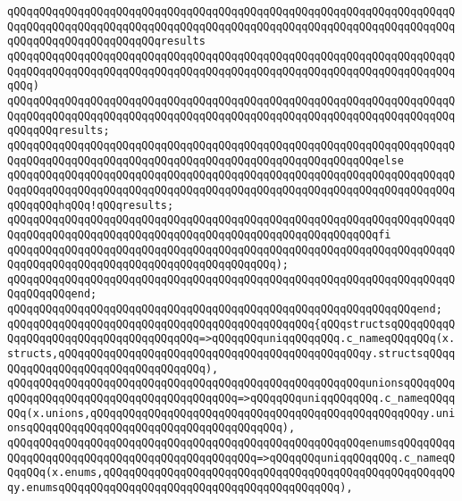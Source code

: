 \verb|qQQqqQQqqQQqqQQqqQQqqQQqqQQqqQQqqQQqqQQqqQQqqQQqqQQqqQQqqQQqqQQqqQQqqQQqqQQqqQQqqQQqqQQqqQQqqQQqqQQqqQQqqQQqqQQqqQQqqQQqqQQqqQQqqQQqqQQqqQQqqQQqqQQqqQQqqQQqqQQqqQQqresults|\newline
\verb|qQQqqQQqqQQqqQQqqQQqqQQqqQQqqQQqqQQqqQQqqQQqqQQqqQQqqQQqqQQqqQQqqQQqqQQqqQQqqQQqqQQqqQQqqQQqqQQqqQQqqQQqqQQqqQQqqQQqqQQqqQQqqQQqqQQqqQQqqQQqqQQq)|\newline
\newline
\verb|qQQqqQQqqQQqqQQqqQQqqQQqqQQqqQQqqQQqqQQqqQQqqQQqqQQqqQQqqQQqqQQqqQQqqQQqqQQqqQQqqQQqqQQqqQQqqQQqqQQqqQQqqQQqqQQqqQQqqQQqqQQqqQQqqQQqqQQqqQQqqQQqqQQqresults;|\newline
\verb|qQQqqQQqqQQqqQQqqQQqqQQqqQQqqQQqqQQqqQQqqQQqqQQqqQQqqQQqqQQqqQQqqQQqqQQqqQQqqQQqqQQqqQQqqQQqqQQqqQQqqQQqqQQqqQQqqQQqqQQqqQQqqQQqelse|\newline
\verb|qQQqqQQqqQQqqQQqqQQqqQQqqQQqqQQqqQQqqQQqqQQqqQQqqQQqqQQqqQQqqQQqqQQqqQQqqQQqqQQqqQQqqQQqqQQqqQQqqQQqqQQqqQQqqQQqqQQqqQQqqQQqqQQqqQQqqQQqqQQqqQQqqQQqhqQQq!qQQqresults;|\newline
\verb|qQQqqQQqqQQqqQQqqQQqqQQqqQQqqQQqqQQqqQQqqQQqqQQqqQQqqQQqqQQqqQQqqQQqqQQqqQQqqQQqqQQqqQQqqQQqqQQqqQQqqQQqqQQqqQQqqQQqqQQqqQQqqQQqfi|\newline
\verb|qQQqqQQqqQQqqQQqqQQqqQQqqQQqqQQqqQQqqQQqqQQqqQQqqQQqqQQqqQQqqQQqqQQqqQQqqQQqqQQqqQQqqQQqqQQqqQQqqQQqqQQqqQQqqQQq);|\newline
\verb|qQQqqQQqqQQqqQQqqQQqqQQqqQQqqQQqqQQqqQQqqQQqqQQqqQQqqQQqqQQqqQQqqQQqqQQqqQQqqQQqend;|\newline
\verb|qQQqqQQqqQQqqQQqqQQqqQQqqQQqqQQqqQQqqQQqqQQqqQQqqQQqqQQqqQQqqQQqend;|\newline
\newline
\verb|qQQqqQQqqQQqqQQqqQQqqQQqqQQqqQQqqQQqqQQqqQQqqQQq{qQQqstructsqQQqqQQqqQQqqQQqqQQqqQQqqQQqqQQqqQQqqQQq=>qQQqqQQquniqqQQqqQQq.c_nameqQQqqQQq(x.structs,qQQqqQQqqQQqqQQqqQQqqQQqqQQqqQQqqQQqqQQqqQQqqQQqy.structsqQQqqQQqqQQqqQQqqQQqqQQqqQQqqQQqqQQq),|\newline
\verb|qQQqqQQqqQQqqQQqqQQqqQQqqQQqqQQqqQQqqQQqqQQqqQQqqQQqqQQqunionsqQQqqQQqqQQqqQQqqQQqqQQqqQQqqQQqqQQqqQQqqQQq=>qQQqqQQquniqqQQqqQQq.c_nameqQQqqQQq(x.unions,qQQqqQQqqQQqqQQqqQQqqQQqqQQqqQQqqQQqqQQqqQQqqQQqqQQqy.unionsqQQqqQQqqQQqqQQqqQQqqQQqqQQqqQQqqQQqqQQq),|\newline
\verb|qQQqqQQqqQQqqQQqqQQqqQQqqQQqqQQqqQQqqQQqqQQqqQQqqQQqqQQqenumsqQQqqQQqqQQqqQQqqQQqqQQqqQQqqQQqqQQqqQQqqQQqqQQq=>qQQqqQQquniqqQQqqQQq.c_nameqQQqqQQq(x.enums,qQQqqQQqqQQqqQQqqQQqqQQqqQQqqQQqqQQqqQQqqQQqqQQqqQQqqQQqy.enumsqQQqqQQqqQQqqQQqqQQqqQQqqQQqqQQqqQQqqQQqqQQq),|\newline
